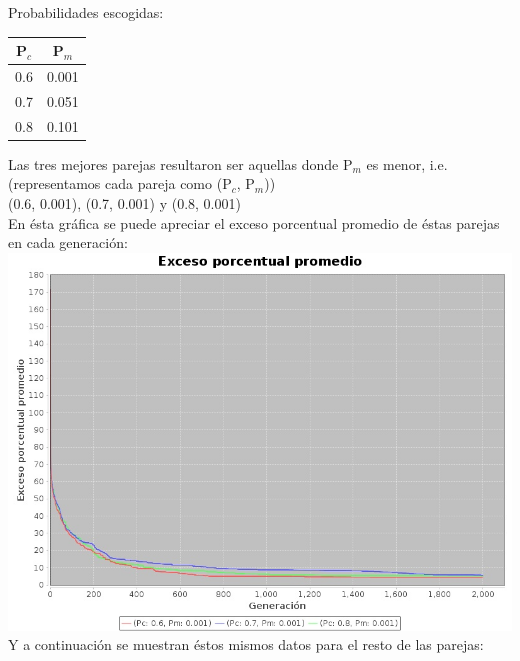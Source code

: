 \documentclass[12pt]{article}
\begin{document}
\noindent Probabilidades escogidas: \\

\begin{center}
    \begin{tabular}{c | c}
      P$_c$ & P$_m$  \\ \hline
      0.6 & 0.001  \\ \hline
      0.7 & 0.051  \\ \hline
      0.8 & 0.101  \\
    \end{tabular}
\end{center}

\noindent Las tres mejores parejas resultaron ser aquellas donde P$_m$ es menor, i.e.
(representamos cada pareja como (P$_c$, P$_m$)) \\
(0.6, 0.001), (0.7, 0.001) y (0.8, 0.001) \\

\noindent En ésta gráfica se puede apreciar el exceso porcentual promedio de éstas  parejas
en cada generación: \\

\includegraphics[width=\textwidth]{datos.jpeg} \\

\noindent Y a continuación se muestran éstos mismos datos para el resto de las parejas: \\
\end{document}
